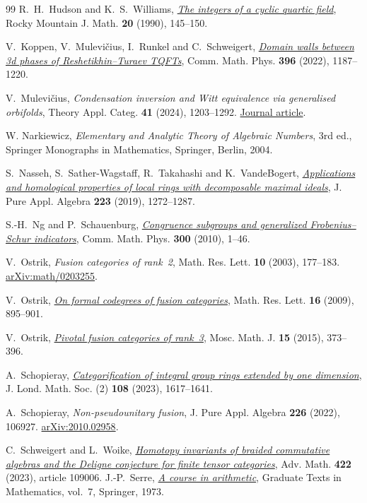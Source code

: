 \documentclass[11pt,reqno]{amsart}
\theoremstyle{remark}\newtheorem{remark}[theorem]{Remark}
\numberwithin{equation}{section}
\begin{document}
\begin{thebibliography}{99}
 R.~H.~Hudson and K.~S.~Williams, \href{https://doi.org/10.1216/RMJM/1181073167}{\emph{The integers of a cyclic quartic field}}, Rocky Mountain J. Math. \textbf{20} (1990), 145--150.

 V.~Koppen, V.~Mulevi\v{c}ius, I.~Runkel and C.~Schweigert, \href{https://doi.org/10.1007/s00220-022-04489-5}{\emph{Domain walls between 3d phases of Reshetikhin--Turaev TQFTs}}, Comm. Math. Phys. \textbf{396} (2022), 1187--1220.

 V.~Mulevi\v{c}ius, \emph{Condensation inversion and Witt equivalence via generalised orbifolds}, Theory Appl. Categ. \textbf{41} (2024), 1203--1292. \href{https://tac.mta.ca/tac/volumes/41/36/41-36abs.html}{Journal article}.

 W. Narkiewicz, \emph{Elementary and Analytic Theory of Algebraic Numbers}, 3rd ed., Springer Monographs in Mathematics, Springer, Berlin, 2004.

 S.~Nasseh, S.~Sather-Wagstaff, R.~Takahashi and K.~VandeBogert, \href{https://doi.org/10.1016/j.jpaa.2018.06.006}{\emph{Applications and homological properties of local rings with decomposable maximal ideals}}, J. Pure Appl. Algebra \textbf{223} (2019), 1272--1287.

 S.-H.~Ng and P.~Schauenburg, \href{https://doi.org/10.1007/s00220-010-1096-6}{\emph{Congruence subgroups and generalized Frobenius--Schur indicators}}, Comm. Math. Phys. \textbf{300} (2010), 1--46.

 V.~Ostrik, \emph{Fusion categories of rank~2}, Math. Res. Lett. \textbf{10} (2003), 177--183. \href{https://arxiv.org/abs/math/0203255}{arXiv:math/0203255}.

 V.~Ostrik, \href{https://doi.org/10.4310/MRL.2009.v16.n5.a11}{\emph{On formal codegrees of fusion categories}}, Math. Res. Lett. \textbf{16} (2009), 895--901.

 V.~Ostrik, \href{https://doi.org/10.17323/1609-4514-2015-15-2-373-396}{\emph{Pivotal fusion categories of rank~3}}, Mosc. Math. J. \textbf{15} (2015), 373--396.

 A.~Schopieray, \href{https://doi.org/10.1112/jlms.12789}{\emph{Categorification of integral group rings extended by one dimension}}, J. Lond. Math. Soc. (2) \textbf{108} (2023), 1617--1641.

 A.~Schopieray, \emph{Non-pseudounitary fusion}, J. Pure Appl. Algebra \textbf{226} (2022), 106927. \href{https://arxiv.org/abs/2010.02958}{arXiv:2010.02958}.

 C.~Schweigert and L.~Woike, \href{https://doi.org/10.1016/j.aim.2023.109006}{\emph{Homotopy invariants of braided commutative algebras and the Deligne conjecture for finite tensor categories}}, Adv. Math. \textbf{422} (2023), article 109006.
 J.-P.~Serre, \href{https://doi.org/10.1007/978-1-4684-9884-4}{\emph{A course in arithmetic}}, Graduate Texts in Mathematics, vol.~7, Springer, 1973.

\end{thebibliography}
\end{document}
